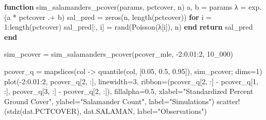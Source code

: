 \documentclass[
  letterpaper,
  DIV=11,
  numbers=noendperiod]{scrartcl}
\newenvironment{Shaded}{\begin{snugshade}}{\end{snugshade}}
\newcommand{\ControlFlowTok}[1]{\textcolor[rgb]{0.00,0.23,0.31}{\textbf{#1}}}
\newcommand{\FloatTok}[1]{\textcolor[rgb]{0.68,0.00,0.00}{#1}}
\newcommand{\FunctionTok}[1]{\textcolor[rgb]{0.28,0.35,0.67}{#1}}
\newcommand{\KeywordTok}[1]{\textcolor[rgb]{0.00,0.23,0.31}{\textbf{#1}}}
\newcommand{\NormalTok}[1]{\textcolor[rgb]{0.00,0.23,0.31}{#1}}
\newcommand{\OperatorTok}[1]{\textcolor[rgb]{0.37,0.37,0.37}{#1}}
\newcommand{\StringTok}[1]{\textcolor[rgb]{0.13,0.47,0.30}{#1}}
\newcommand*\circled[1]{\tikz[baseline=(char.base)]{
          \node[shape=circle,draw,inner sep=1pt] (char) {{\scriptsize#1}};}}
\begin{document}
\label{annotated-cell-22}%
\begin{Shaded}
\begin{Highlighting}[]
\KeywordTok{function} \FunctionTok{sim\_salamanders\_pcover}\NormalTok{(params, pctcover, n)}
\NormalTok{    a, b }\OperatorTok{=}\NormalTok{ params}
\NormalTok{    λ }\OperatorTok{=} \FunctionTok{exp}\NormalTok{.(a }\OperatorTok{*}\NormalTok{ pctcover }\OperatorTok{.+}\NormalTok{ b)}
\NormalTok{    sal\_pred }\OperatorTok{=} \FunctionTok{zeros}\NormalTok{(n, }\FunctionTok{length}\NormalTok{(pctcover))}
    \ControlFlowTok{for}\NormalTok{ i }\OperatorTok{=} \FloatTok{1}\OperatorTok{:}\FunctionTok{length}\NormalTok{(pctcover)}
\NormalTok{        sal\_pred[}\OperatorTok{:}\NormalTok{, i] }\OperatorTok{=} \FunctionTok{rand}\NormalTok{(}\FunctionTok{Poisson}\NormalTok{(λ[i]), n)}
    \ControlFlowTok{end}
    \ControlFlowTok{return}\NormalTok{ sal\_pred}
\KeywordTok{end}

\NormalTok{sim\_pcover }\OperatorTok{=} \FunctionTok{sim\_salamanders\_pcover}\NormalTok{(pcover\_mle, }\OperatorTok{{-}}\FloatTok{2}\OperatorTok{:}\FloatTok{0.01}\OperatorTok{:}\FloatTok{2}\NormalTok{, }\FloatTok{10\_000}\NormalTok{) }\hspace*{\fill}\NormalTok{\circled{1}}

\NormalTok{pcover\_q }\OperatorTok{=} \FunctionTok{mapslices}\NormalTok{(col }\OperatorTok{{-}\textgreater{}} \FunctionTok{quantile}\NormalTok{(col, [}\FloatTok{0.05}\NormalTok{, }\FloatTok{0.5}\NormalTok{, }\FloatTok{0.95}\NormalTok{]), sim\_pcover; dims}\OperatorTok{=}\FloatTok{1}\NormalTok{) }
\FunctionTok{plot}\NormalTok{(}\OperatorTok{{-}}\FloatTok{2}\OperatorTok{:}\FloatTok{0.01}\OperatorTok{:}\FloatTok{2}\NormalTok{, pcover\_q[}\FloatTok{2}\NormalTok{, }\OperatorTok{:}\NormalTok{], linewidth}\OperatorTok{=}\FloatTok{3}\NormalTok{, ribbon}\OperatorTok{=}\NormalTok{(pcover\_q[}\FloatTok{2}\NormalTok{, }\OperatorTok{:}\NormalTok{] }\OperatorTok{{-}}\NormalTok{ pcover\_q[}\FloatTok{1}\NormalTok{, }\OperatorTok{:}\NormalTok{], pcover\_q[}\FloatTok{3}\NormalTok{, }\OperatorTok{:}\NormalTok{] }\OperatorTok{{-}}\NormalTok{ pcover\_q[}\FloatTok{2}\NormalTok{, }\OperatorTok{:}\NormalTok{]), fillalpha}\OperatorTok{=}\FloatTok{0.5}\NormalTok{, xlabel}\OperatorTok{=}\StringTok{"Standardized Percent Ground Cover"}\NormalTok{, ylabel}\OperatorTok{=}\StringTok{"Salamander Count"}\NormalTok{, label}\OperatorTok{=}\StringTok{"Simulations"}\NormalTok{) }
\FunctionTok{scatter!}\NormalTok{(}\FunctionTok{stdz}\NormalTok{(dat.PCTCOVER), dat.SALAMAN, label}\OperatorTok{=}\StringTok{"Observations"}\NormalTok{)}
\end{Highlighting}
\end{Shaded}
\end{document}
